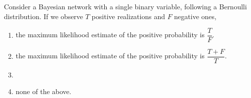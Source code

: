 \documentclass[11pt, a4paper]{exam}
\begin{document}
\begin{quiz}
    \item Consider a Bayesian network with a single binary variable, following a Bernoulli distribution. If we observe $T$ positive realizations and $F$ negative ones,
    \begin{enumerate}[label=$\bigcirc$]
        \item the maximum likelihood estimate of the positive probability is $\dfrac{T}{F}$.
        \item the maximum likelihood estimate of the positive probability is $\dfrac{T + F}{T}$.
        \item {}
        \item none of the above.
    \end{enumerate}
\end{quiz}
\end{document}
